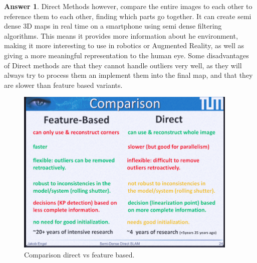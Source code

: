\documentclass[a4paper,12 pt]{article}
\theoremstyle{definition}
\theoremstyle{remark}
\theoremstyle{definition}
\theoremstyle{definition}
\theoremstyle{definition}
\theoremstyle{definition}
\theoremstyle{remark}
\theoremstyle{remark}
\theoremstyle{definition}
\theoremstyle{definition}
\newtheorem*{answer}{Answer}
\begin{document}
\begin{enumerate}
\begin{answer}
Direct Methods however, compare the entire images to each other to reference them to each other, finding which parts go together. It can create semi dense 3D maps in real time on a smartphone using semi dense filtering algorithms. This means it provides more information about he environment, making it more interesting to use in robotics or Augmented Reality, as well as giving a more meaningful representation to the human eye. Some disadvantages of Direct methods are that they cannot handle outliers very well, as they will always try to process them an implement them into the final map, and that they are slower than feature based variants. 
\begin{figure}[h!]
\begin{center}
\includegraphics[scale=0.65]{pics/direct}
\caption{Comparison direct vs feature based. \label{fig:direct}}
\end{center}
\end{figure}
\end{answer}


\end{enumerate}

\newpage
\end{document}
